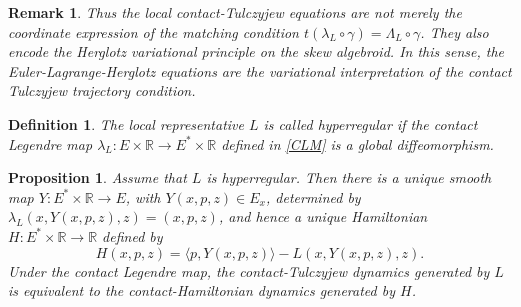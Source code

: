 \documentclass[11pt]{article}
\newtheorem{proposition}[theorem]{Proposition}
\newtheorem{definition}[theorem]{Definition}
\newtheorem{remark}[theorem]{Remark}
\newcommand{\R}{\mathbb{R}}
\begin{document}
\begin{remark}
Thus the local contact-Tulczyjew equations are not merely the coordinate
expression of the matching condition
$t(\lambda_L\circ\gamma)=\Lambda_L\circ\gamma$. They also encode the Herglotz variational principle on the skew algebroid.
In this sense, the Euler-Lagrange-Herglotz equations are the variational
interpretation of the contact Tulczyjew trajectory condition.
\end{remark}



\begin{definition}
The local representative $L$ is called hyperregular if the contact Legendre map
$\lambda_L:E\times\R\to E^*\times\R$ defined in \eqref{CLM} is a global diffeomorphism.
\end{definition}

\begin{proposition}
\label{prop:hyperregular}
Assume that \(L\) is hyperregular. Then there is a unique smooth map $Y:E^*\times\R\to E$, with \(Y(x,p,z)\in E_x\), determined by
$\lambda_L(x,Y(x,p,z),z)=(x,p,z)$, and hence a unique Hamiltonian \(H:E^*\times\R\to\R\) defined by
\[
H(x,p,z)=\langle p,Y(x,p,z)\rangle-L(x,Y(x,p,z),z).
\]
Under the contact Legendre map, the contact-Tulczyjew dynamics generated
by \(L\) is equivalent to the contact-Hamiltonian dynamics generated by
\(H\).
\end{proposition}
\end{document}

